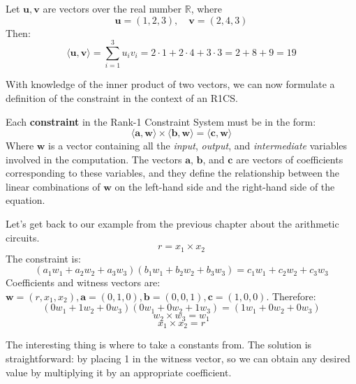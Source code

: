 \documentclass[../lecture-notes.tex]{subfiles}
\begin{document}
\begin{example}
    Let $\mathbf{u}, \mathbf{v}$ are vectors over the real number $\mathbb{R}$, where
    \begin{equation*}
        \mathbf{u} = (1, 2, 3), \quad \mathbf{v} = (2, 4, 3)
    \end{equation*}
    Then: 
    \begin{equation*}
        \langle \mathbf{u}, \mathbf{v}\rangle = \sum_{i=1}^{3}u_iv_i = 2 \cdot 1 + 2 \cdot 4 + 3 \cdot 3 = 2 + 8 + 9 = 19
    \end{equation*}
\end{example}

With knowledge of the inner product of two vectors, we can now formulate a definition of the 
constraint in the context of an R1CS.

\begin{definition}
    Each \textbf{constraint} in the Rank-1 Constraint System must be in the form:
    \begin{equation*}
        \langle \mathbf{a}, \mathbf{w}\rangle \times \langle \mathbf{b}, \mathbf{w}\rangle = \langle \mathbf{c}, \mathbf{w}\rangle
    \end{equation*}
    Where $\mathbf{w}$ is a vector containing all the \textit{input}, \textit{output}, and 
    \textit{intermediate} variables involved in the computation. The vectors $\mathbf{a}$, 
    $\mathbf{b}$, and $\mathbf{c}$ are vectors of coefficients corresponding to these variables, 
    and they define the relationship between the linear combinations of $\mathbf{w}$ on the 
    left-hand side and the right-hand side of the equation.
\end{definition}

\begin{example}
    Let's get back to our example from the previous chapter about the arithmetic circuits.
    \[ r = x_1 \times x_2 \]
    The constraint is:
    \[(a_1w_1 + a_2w_2 + a_3w_3)(b_1w_1 + b_2w_2 + b_3w_3) = c_1w_1 + c_2w_2 + c_3w_3\]
    Coefficients and witness vectors are:
    $\mathbf{w} = (r, x_1, x_2), \mathbf{a} = (0, 1, 0), \mathbf{b} = (0, 0, 1), \mathbf{c} = (1, 0, 0)$. Therefore:
    \[ (0w_1 + 1w_2 + 0w_3)(0w_1 + 0w_2 + 1w_3) = (1w_1 + 0w_2 + 0w_3) \]
    \[ w_2 \times w_3 = w_1 \]
    \[ x_1 \times x_2 = r \]
\end{example}

The interesting thing is where to take a constants from. The solution is straightforward: by placing
1 in the witness vector, so we can obtain any desired value by multiplying it by an appropriate 
coefficient.
\end{document}
